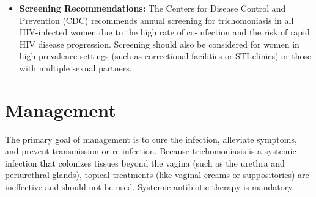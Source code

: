\begin{itemize}
\begin{itemize}
        \item \textbf{Rapid Antigen Tests and Molecular Probes:} These are FDA-approved point-of-care tests that detect specific protozoan antigens or nucleic acids. They offer high sensitivity and specificity (approaching that of laboratory NAATs) and provide results in 10 to 30 minutes, making them valuable in settings without access to immediate microscopy or complex laboratory infrastructure.
        \item \textbf{Protozoal Culture:} Culture involves inoculating vaginal or urethral specimens into specialized liquid media (such as Diamond's medium or the InPouch TV system) and incubating them for 2 to 7 days. The media is examined microscopically every 24 to 48 hours for the growth of trichomonads. While culture was historically the gold standard, it has been largely superseded by NAATs due to the long turnaround time and specialized storage requirements, though it remains useful for evaluating drug-resistant strains.
    \end{itemize}
    \item \textbf{Screening Recommendations:} The Centers for Disease Control and Prevention (CDC) recommends annual screening for trichomoniasis in all HIV-infected women due to the high rate of co-infection and the risk of rapid HIV disease progression. Screening should also be considered for women in high-prevalence settings (such as correctional facilities or STI clinics) or those with multiple sexual partners.
\end{itemize}

\section*{Management}
The primary goal of management is to cure the infection, alleviate symptoms, and prevent transmission or re-infection. Because trichomoniasis is a systemic infection that colonizes tissues beyond the vagina (such as the urethra and periurethral glands), topical treatments (like vaginal creams or suppositories) are ineffective and should not be used. Systemic antibiotic therapy is mandatory.

